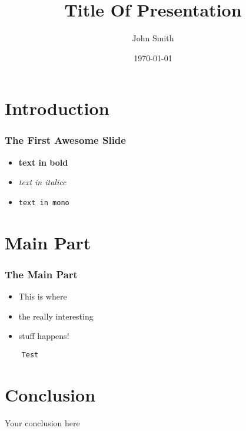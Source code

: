 \documentclass{beamer}
\title{Title Of Presentation}
\author{John Smith}
\institute{codecentric AG}
\date{\today}
\begin{document}
 
\frame{\titlepage}

\section{Introduction}
\label{sec:introduction}
 
\begin{frame}
\frametitle{The First Awesome Slide}
\begin{itemize}
\item \textbf{text in bold}
\item \textit{text in italicc}
\item \texttt{text in mono}
\end{itemize}
\end{frame}

\section{Main Part}
\label{sec:main-part}
\begin{frame}
  \frametitle{The Main Part}
  \begin{itemize}
  \item This is where
  \item the really interesting
  \item stuff happens!
  \end{itemize}
\end{frame}

\begin{frame}[fragile]
  \begin{verbatim}
    Test
  \end{verbatim}
\end{frame}

\section{Conclusion}
\label{sec:conclusion}

\begin{frame}
  \begin{center}
    \huge
    Your conclusion here
  \end{center}
\end{frame}
 
\end{document}
